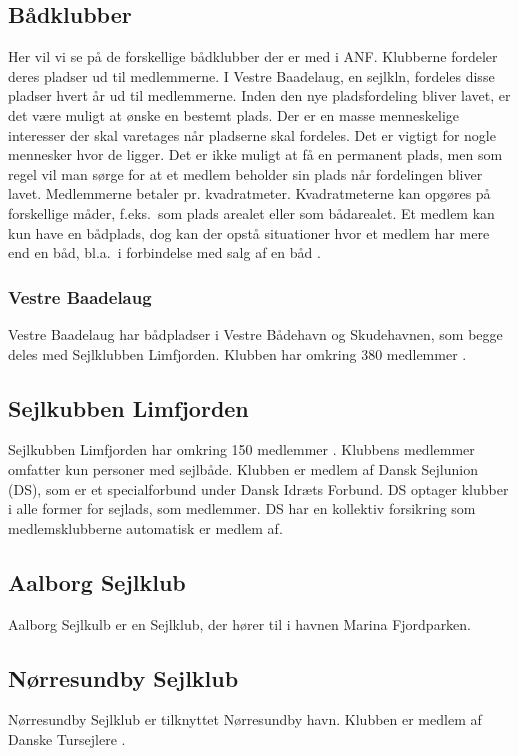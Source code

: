 \subsection{Bådklubber}
Her vil vi se på de forskellige bådklubber der er med i ANF. Klubberne fordeler deres pladser ud til medlemmerne. I Vestre Baadelaug, en sejlkln, fordeles disse pladser hvert år ud til medlemmerne. Inden den nye pladsfordeling bliver lavet, er det være muligt at ønske en bestemt plads. Der er en masse menneskelige interesser der skal varetages når pladserne skal fordeles. Det er vigtigt for nogle mennesker hvor de ligger. Det er ikke muligt at få en permanent plads, men som regel vil man sørge for at et medlem beholder sin plads når fordelingen bliver lavet. Medlemmerne betaler pr. kvadratmeter. Kvadratmeterne kan opgøres på forskellige måder, f.eks.\ som plads arealet eller som bådarealet. Et medlem kan kun have en bådplads, dog kan der opstå situationer hvor et medlem har mere end en båd, bl.a.\ i forbindelse med salg af en båd \cite{int_vb_sl}.

\subsubsection{Vestre Baadelaug}
Vestre Baadelaug har bådpladser i Vestre Bådehavn og Skudehavnen, som begge deles med Sejlklubben Limfjorden. Klubben har omkring 380 medlemmer \cite{int_vb_sl}. 

\subsection{Sejlkubben Limfjorden}
Sejlkubben Limfjorden har omkring 150 medlemmer \cite{int_vb_sl}. Klubbens medlemmer omfatter kun personer med sejlbåde. Klubben er medlem af Dansk Sejlunion (DS), som er et specialforbund under Dansk Idræts Forbund. DS optager klubber i alle former for sejlads, som medlemmer. DS har en kollektiv forsikring som medlemsklubberne automatisk er medlem af. 

\subsection{Aalborg Sejlklub}
Aalborg Sejlkulb er en Sejlklub, der hører til i havnen Marina Fjordparken.

\subsection{Nørresundby Sejlklub}
Nørresundby Sejlklub er tilknyttet Nørresundby havn. Klubben er medlem af Danske Tursejlere \cite{norresundby_sejlklub}.

